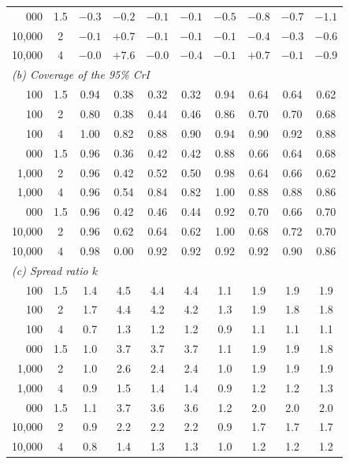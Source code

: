 \begin{tabular}{r c cccc cccc}
\addlinespace
10{,}000 & 1.5 & $-0.3$ & $-0.2$ & $-0.1$ & $-0.1$ & $-0.5$ & $-0.8$ & $-0.7$ & $-1.1$ \\
10{,}000 & 2 & $-0.1$ & ${+}0.7$ & $-0.1$ & $-0.1$ & $-0.1$ & $-0.4$ & $-0.3$ & $-0.6$ \\
10{,}000 & 4 & $-0.0$ & ${+}7.6$ & $-0.0$ & $-0.4$ & $-0.1$ & ${+}0.7$ & $-0.1$ & $-0.9$ \\
\midrule
\multicolumn{10}{l}{\textit{(b) Coverage of the 95\% CrI}} \\
100 & 1.5 & 0.94 & 0.38 & 0.32 & 0.32 & 0.94 & 0.64 & 0.64 & 0.62 \\
100 & 2 & 0.80 & 0.38 & 0.44 & 0.46 & 0.86 & 0.70 & 0.70 & 0.68 \\
100 & 4 & 1.00 & 0.82 & 0.88 & 0.90 & 0.94 & 0.90 & 0.92 & 0.88 \\
\addlinespace
1{,}000 & 1.5 & 0.96 & 0.36 & 0.42 & 0.42 & 0.88 & 0.66 & 0.64 & 0.68 \\
1{,}000 & 2 & 0.96 & 0.42 & 0.52 & 0.50 & 0.98 & 0.64 & 0.66 & 0.62 \\
1{,}000 & 4 & 0.96 & 0.54 & 0.84 & 0.82 & 1.00 & 0.88 & 0.88 & 0.86 \\
\addlinespace
10{,}000 & 1.5 & 0.96 & 0.42 & 0.46 & 0.44 & 0.92 & 0.70 & 0.66 & 0.70 \\
10{,}000 & 2 & 0.96 & 0.62 & 0.64 & 0.62 & 1.00 & 0.68 & 0.72 & 0.70 \\
10{,}000 & 4 & 0.98 & 0.00 & 0.92 & 0.92 & 0.92 & 0.92 & 0.90 & 0.86 \\
\midrule
\multicolumn{10}{l}{\textit{(c) Spread ratio $k$}} \\
100 & 1.5 & 1.4 & 4.5 & 4.4 & 4.4 & 1.1 & 1.9 & 1.9 & 1.9 \\
100 & 2 & 1.7 & 4.4 & 4.2 & 4.2 & 1.3 & 1.9 & 1.8 & 1.8 \\
100 & 4 & 0.7 & 1.3 & 1.2 & 1.2 & 0.9 & 1.1 & 1.1 & 1.1 \\
\addlinespace
1{,}000 & 1.5 & 1.0 & 3.7 & 3.7 & 3.7 & 1.1 & 1.9 & 1.9 & 1.8 \\
1{,}000 & 2 & 1.0 & 2.6 & 2.4 & 2.4 & 1.0 & 1.9 & 1.9 & 1.9 \\
1{,}000 & 4 & 0.9 & 1.5 & 1.4 & 1.4 & 0.9 & 1.2 & 1.2 & 1.3 \\
\addlinespace
10{,}000 & 1.5 & 1.1 & 3.7 & 3.6 & 3.6 & 1.2 & 2.0 & 2.0 & 2.0 \\
10{,}000 & 2 & 0.9 & 2.2 & 2.2 & 2.2 & 0.9 & 1.7 & 1.7 & 1.7 \\
10{,}000 & 4 & 0.8 & 1.4 & 1.3 & 1.3 & 1.0 & 1.2 & 1.2 & 1.2 \\
\bottomrule
\end{tabular}
